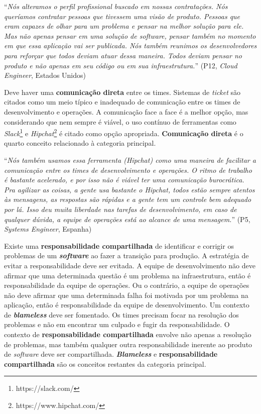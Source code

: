 \begin{mq}
``\emph{Nós alteramos o perfil profissional buscado em nossas contratações. Nós
queríamos contratar pessoas que tivessem uma visão de produto. Pessoas que eram
capazes de olhar para um problema e pensar na melhor solução para ele. Mas não
apenas pensar em uma solução de software, pensar também no momento em que essa
aplicação vai ser publicada. Nós também reunimos os desenvolvedores para
reforçar que todos deviam atuar dessa maneira. Todos deviam pensar no produto e
não apenas em seu código ou em sua infraestrutura.}'' (P12, {\it Cloud Engineer},
Estados Unidos)
\end{mq}

Deve haver uma {\bf comunicação direta} entre os times. Sistemas de {\it
ticket} são citados como um meio típico e inadequado de comunicação entre os
times de desenvolvimento e operações. A comunicação face a face é a melhor
opção, mas considerando que nem sempre é viável, o uso contínuo de ferramentas
como \emph{Slack}\footnote{https://slack.com/} e \emph{Hipchat}\footnote{https://www.hipchat.com/}
é citado como opção apropriada. {\bf Comunicação direta} é o quarto conceito
relacionado à categoria principal.

\begin{mq}
``\emph{Nós também usamos essa ferramenta ({\it Hipchat})
como uma maneira de facilitar a comunicação entre os times de desenvolvimento e
operações. O ritmo de trabalho é bastante acelerado, e por isso não é viável ter
uma comunicação burocrática. Pra agilizar as coisas, a gente usa bastante o
{\it Hipchat}, todos estão sempre atentos às mensagens, as respostas são
rápidas e a gente tem um controle bem adequado por lá. Isso deu muita liberdade
nas tarefas de desenvolvimento, em caso de qualquer dúvida, a equipe de
operações está ao alcance de uma mensagem.}'' (P5, {\it Systems Engineer}, Espanha)
\end{mq}

Existe uma {\bf responsabilidade compartilhada} de identificar e corrigir os
problemas de um {\bf \emph{software}} ao fazer a transição para produção. A estratégia
de evitar a responsabilidade deve ser evitada. A equipe de desenvolvimento não
deve afirmar que uma determinada questão é um problema na infraestrutura, então
é responsabilidade da equipe de operações. Ou o contrário, a equipe de operações
não deve afirmar que uma determinada falha foi motivada por um problema na
aplicação, então é responsabilidade da equipe de desenvolvimento. Um contexto de
{\bf \emph{blameless}} deve ser fomentado. Os times precisam focar na resolução dos
problemas e não em encontrar um culpado e fugir da responsabilidade. O contexto
de {\bf responsabilidade compartilhada} envolve não apenas a resolução de
problemas, mas também qualquer outra responsabilidade inerente ao produto de
{\it software} deve ser compartilhada. {\bf \emph{Blameless}} e {\bf responsabilidade
compartilhada} são os conceitos restantes da categoria principal.

